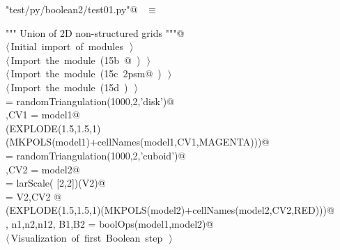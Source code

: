 \documentclass[11pt,oneside]{article}	%
\begin{document}
\begin{flushleft} \small
\begin{minipage}{\linewidth} \label{scrap26}
\verb@"test/py/boolean2/test01.py"@\nobreak\ {\footnotesize {} }$\equiv$
\vspace{-1ex}
\begin{list}{}{} \item
\mbox{}\verb@""" Union of 2D non-structured grids """@\\
\mbox{}\verb@@\hbox{$\langle\,$Initial import of modules\nobreak\ {\footnotesize {}}$\,\rangle$}\verb@@\\
\mbox{}\verb@@\hbox{$\langle\,$Import the module\nobreak\ ({\footnotesize 15b\label{scrap27}
 }\mbox{}@ ) {\footnotesize {}}$\,\rangle$}\verb@@\\
\mbox{}\verb@@\hbox{$\langle\,$Import the module\nobreak\ ({\footnotesize 15c\label{scrap28}
 }\mbox{}\verb@lar2psm@ ) {\footnotesize {}}$\,\rangle$}\verb@@\\
\mbox{}\verb@@\hbox{$\langle\,$Import the module\nobreak\ ({\footnotesize 15d\label{scrap29}
 }\mbox{}\verb@myfont@ ) {\footnotesize {}}$\,\rangle$}\verb@@\\
\mbox{} = randomTriangulation(1000,2,'disk')@\\
\mbox{},CV1 = model1@\\
\mbox{}\verb@VIEW(EXPLODE(1.5,1.5,1)(MKPOLS(model1)+cellNames(model1,CV1,MAGENTA)))@\\
\mbox{} = randomTriangulation(1000,2,'cuboid')@\\
\mbox{},CV2 = model2@\\
\mbox{} = larScale( [2,2])(V2)@\\
\mbox{} = V2,CV2 @\\
\mbox{}\verb@VIEW(EXPLODE(1.5,1.5,1)(MKPOLS(model2)+cellNames(model2,CV2,RED)))@\\
\mbox{}\verb@V, n1,n2,n12, B1,B2 = boolOps(model1,model2)@\\
\mbox{}\verb@@\hbox{$\langle\,$Visualization of first Boolean step\nobreak\ {\footnotesize {}}$\,\rangle$}\verb@@\\
\mbox{}\verb@@{\NWsep}
\end{list}
\vspace{-2ex}
\end{minipage}\\[4ex]
\end{flushleft}
\end{document}
